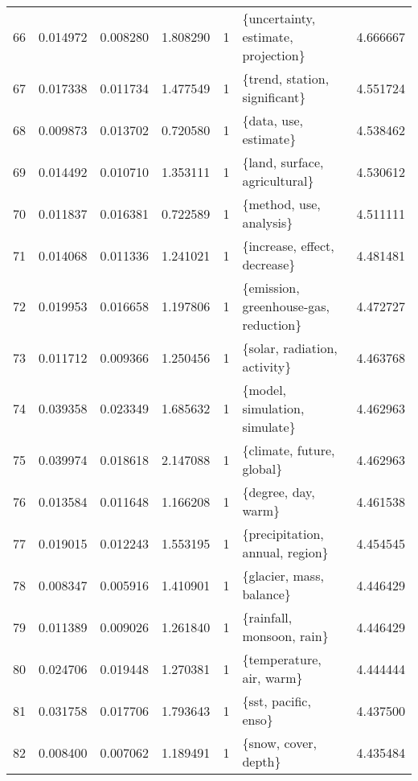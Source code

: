 \begin{tabular}{lrrrrlr}
66 &    0.014972 &  0.008280 &        1.808290 &           1 &     \{uncertainty, estimate, projection\} &  4.666667 \\
67 &    0.017338 &  0.011734 &        1.477549 &           1 &           \{trend, station, significant\} &  4.551724 \\
68 &    0.009873 &  0.013702 &        0.720580 &           1 &                   \{data, use, estimate\} &  4.538462 \\
69 &    0.014492 &  0.010710 &        1.353111 &           1 &           \{land, surface, agricultural\} &  4.530612 \\
70 &    0.011837 &  0.016381 &        0.722589 &           1 &                 \{method, use, analysis\} &  4.511111 \\
71 &    0.014068 &  0.011336 &        1.241021 &           1 &            \{increase, effect, decrease\} &  4.481481 \\
72 &    0.019953 &  0.016658 &        1.197806 &           1 &   \{emission, greenhouse-gas, reduction\} &  4.472727 \\
73 &    0.011712 &  0.009366 &        1.250456 &           1 &            \{solar, radiation, activity\} &  4.463768 \\
74 &    0.039358 &  0.023349 &        1.685632 &           1 &           \{model, simulation, simulate\} &  4.462963 \\
75 &    0.039974 &  0.018618 &        2.147088 &           1 &               \{climate, future, global\} &  4.462963 \\
76 &    0.013584 &  0.011648 &        1.166208 &           1 &                     \{degree, day, warm\} &  4.461538 \\
77 &    0.019015 &  0.012243 &        1.553195 &           1 &         \{precipitation, annual, region\} &  4.454545 \\
78 &    0.008347 &  0.005916 &        1.410901 &           1 &                \{glacier, mass, balance\} &  4.446429 \\
79 &    0.011389 &  0.009026 &        1.261840 &           1 &               \{rainfall, monsoon, rain\} &  4.446429 \\
80 &    0.024706 &  0.019448 &        1.270381 &           1 &                \{temperature, air, warm\} &  4.444444 \\
81 &    0.031758 &  0.017706 &        1.793643 &           1 &                    \{sst, pacific, enso\} &  4.437500 \\
82 &    0.008400 &  0.007062 &        1.189491 &           1 &                    \{snow, cover, depth\} &  4.435484 \\

\end{tabular}
